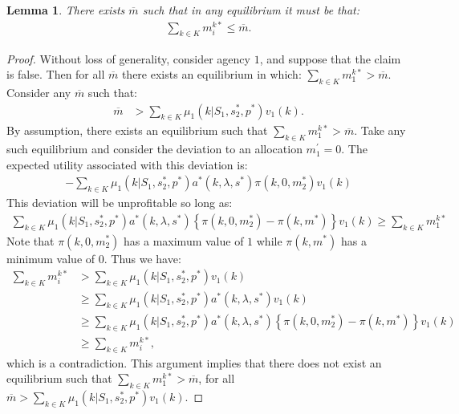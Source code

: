 \documentclass[12pt]{article}
\newtheorem{lemma}[theorem]{Lemma}
\begin{document}
\begin{lemma}There exists $\overline{m}$ such that in any equilibrium it must be that:
\begin{align*}
\sum_{k\in K} m_i^{k*} \leq \overline{m}.%
\end{align*}\label{upper bound}
\end{lemma}
\begin{proof}
Without loss of generality, consider agency $1$, and suppose that the claim is false.  Then for all $\overline{m}$ there exists an equilibrium in which: $\sum_{k \in K} m_1^{k*} > \overline{m}$.  Consider any $\overline{m}$ such that:
\begin{align*}
\overline{m}&>\sum_{k \in K} \mu_1(k|S_1,s_2^*,p^*)v_1(k).
\end{align*}By assumption, there exists an equilibrium such that $\sum_{k \in K} m_1^{k*} > \overline{m}$.  Take any such equilibrium and consider the deviation to an allocation $m^{\prime}_1=0$.  The expected utility associated with this deviation is:
\begin{align*}
-\sum_{k\in K} \mu_1(k|S_1,s_2^*,p^*)a^*(k,\lambda,s^*)\pi(k,0,m_2^*)v_1(k)
\end{align*}This deviation will be unprofitable so long as:
\begin{align*}
\sum_{k\in K} \mu_1(k|S_1,s_2^*,p^*) a^*(k,\lambda,s^*)\left\{\pi(k,0,m^*_2)-\pi(k,m^*)\right\}v_1(k)\geq \sum_{k\in K}m_1^{k*}
\end{align*}Note that $\pi(k,0,m_2^*)$ has a maximum value of $1$ while $\pi(k,m^*)$ has a minimum value of $0$.  Thus we have:
\begin{align*}
\sum_{k\in K}m_i^{k*}&>\sum_{k \in K} \mu_1(k|S_1,s_2^*,p^*)v_1(k)\\
&\geq
\sum_{k\in K}\mu_1(k|S_1,s_2^*,p^*)a^*(k, \lambda,s^*)v_1(k)\\
&\geq
\sum_{k \in K} \mu_1(k|S_1,s_2^*,p^*)a^*(k,\lambda,s^*)\left\{\pi(k,0,m^*_2)-\pi(k,m^*)\right\}v_1(k)\\
&\geq\sum_{k\in K}m_i^{k*},
\end{align*}
which is a contradiction.  This argument implies that there does not exist an equilibrium such that $\sum_{k \in K} m_1^{k*} > \overline{m}$, for all $\overline{m}>\sum_{k \in K} \mu_1(k|S_1,s_2^*,p^*)v_1(k)$.  
\end{proof}
\end{document}
